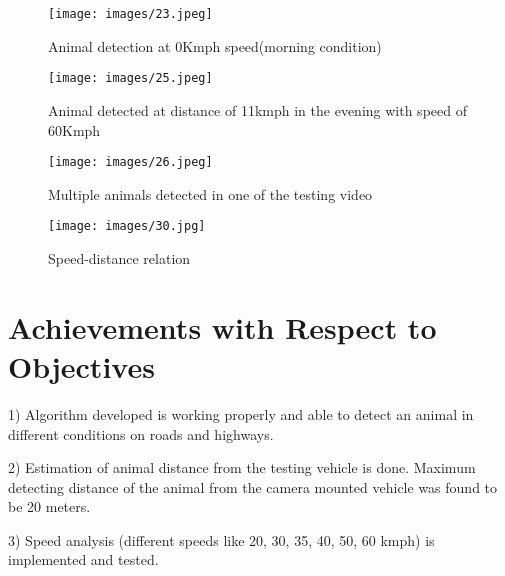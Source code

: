 \documentclass[14pt,a4paper,final]{extreport}
\begin{document}
\begin{figure}[h]
	\begin{center}
		\texttt{[image: images/23.jpeg]}
		\vspace{.1 cm}
		\caption[Animal detection at 0Kmph speed(morning condition)]{Animal detection at 0Kmph speed(morning condition)}
	\end{center}
\end{figure}
\begin{figure}[h]
	\begin{center}
		\texttt{[image: images/25.jpeg]}
		\vspace{.1 cm}
		\caption[Animal detected at distance of 11kmph in the evening with speed of 60Kmph]{Animal detected at distance of 11kmph in the evening with speed of 60Kmph}
	\end{center}
\end{figure}

\begin{figure}[h]
	\begin{center}
		\texttt{[image: images/26.jpeg]}
		\vspace{.1 cm}
		\caption[Multiple animals detected in one of the testing video]{Multiple animals detected in one of the testing video}
	\end{center}
\end{figure}

\begin{figure}[h]
	\begin{center}
		\texttt{[image: images/30.jpg]}
		\vspace{.1 cm}
		\caption[Speed-distance relation]{Speed-distance relation}
	\end{center}
\end{figure}

\chapter{Achievements with Respect to Objectives}
\item 1) Algorithm developed is working properly and able to detect an animal in different conditions on roads and highways.

\item 2) Estimation of animal distance from the testing vehicle is done. Maximum detecting distance of the animal from the camera mounted vehicle was found to be 20 meters.

\item 3) Speed analysis (different speeds like 20, 30, 35, 40, 50, 60 kmph) is implemented and tested.
\end{document}
